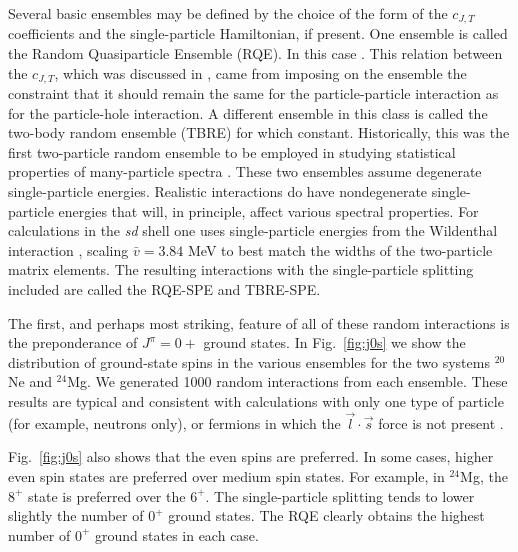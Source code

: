 \documentclass[preprint,rmp,aps,floatfix]{revtex4}
\begin{document}
Several basic ensembles may be defined by the choice of
the form of the $c_{J,T}$ coefficients
and the single-particle Hamiltonian, if present. One 
ensemble is called the
Random Quasiparticle Ensemble (RQE).
In this case .
This relation between the $c_{J,T}$, which was discussed in \cite{jbd98},
came from imposing on the ensemble the constraint that
it should remain the same for the particle-particle
interaction as for the particle-hole interaction. A different
ensemble in this class is called the 
two-body random ensemble (TBRE) for which  constant.
Historically, this was the
first two-particle random ensemble to be employed in studying statistical
properties of many-particle
spectra \cite{fr70}. These two ensembles assume degenerate
single-particle energies.
Realistic interactions do have nondegenerate single-particle
energies that will, in principle, affect various
spectral properties.  For calculations in the {\it sd} shell one
uses single-particle energies from the Wildenthal interaction
\cite{wildenthal}, scaling
$\bar{v}=3.84$ MeV
to best match the widths of the two-particle matrix elements.
The resulting interactions with the single-particle splitting included
are called the RQE-SPE and TBRE-SPE.

The first, and perhaps most striking, feature of all of these 
random interactions is the preponderance of $J^\pi=0+$ ground states. 
In Fig.~\ref{fig:j0s} we show the distribution of ground-state spins
in the various ensembles for the two systems $^{20}$Ne and $^{24}$Mg. 
We generated 1000 random interactions from each ensemble. These results
are typical and consistent with calculations with only one type
of particle (for example, neutrons only), or fermions in which the 
$\vec{l}\cdot\vec{s}$ force is not present \cite{kaplan01}.

Fig.~\ref{fig:j0s} also shows that the even spins are preferred. 
In some cases, higher even spin states are preferred over medium
spin states. For example, in $^{24}$Mg, the $8^+$ state is preferred
over the $6^+$. The single-particle splitting tends to lower slightly
the number of $0^+$ ground states. The RQE clearly obtains the highest
number of $0^+$ ground states in each case. 
\end{document}
